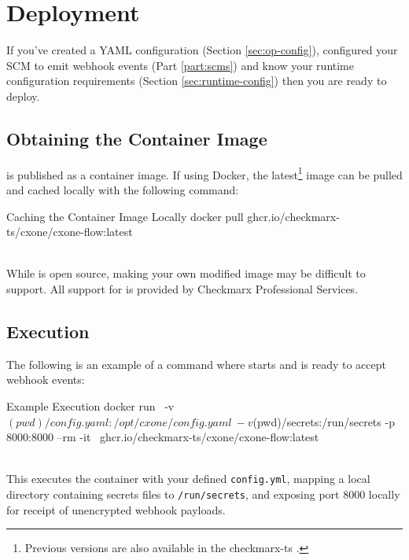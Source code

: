 \chapter{Deployment}\label{sec:deployment}

If you've created a YAML configuration (Section \ref{sec:op-config}), configured your SCM to emit webhook events
(Part \ref{part:scms}) and know your runtime configuration requirements (Section \ref{sec:runtime-config}) then
you are ready to deploy.

\section{Obtaining the Container Image}

\cxoneflow is published as a container image.  If using Docker, the
latest\footnote{Previous versions are also available in the
checkmarx-ts .} image can be pulled and cached locally
with the following command:

\begin{code}{Caching the \cxoneflow Container Image Locally}{}{}
docker pull ghcr.io/checkmarx-ts/cxone/cxone-flow:latest
\end{code}

\noindent\\While \cxoneflow is open source, making your own modified image may be difficult to support.  All
support for \cxoneflow is provided by Checkmarx Professional Services.

\section{\cxoneflowtext\space Execution}

The following is an example of a command where \cxoneflow starts and is ready to accept webhook events:

\begin{code}{\cxoneflow Example Execution}{}{}
docker run \
    -v $(pwd)/config.yaml:/opt/cxone/config.yaml \
    -v $(pwd)/secrets:/run/secrets -p 8000:8000 --rm -it \ 
    ghcr.io/checkmarx-ts/cxone/cxone-flow:latest
\end{code}

\noindent\\This executes the container with your defined \texttt{config.yml}, mapping a local directory
containing secrets files to \texttt{/run/secrets}, and exposing port 8000 locally for receipt of 
unencrypted webhook payloads.




